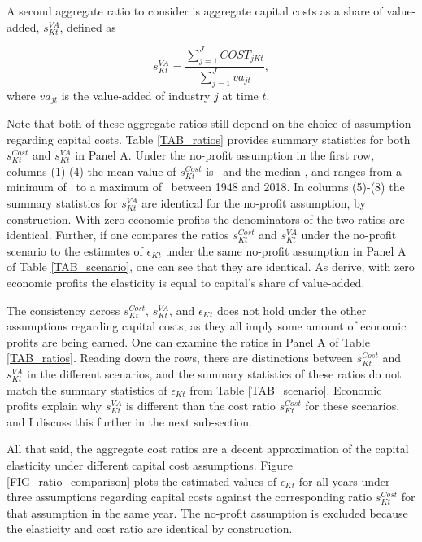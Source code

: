 \documentclass[11pt]{article}
\begin{document}
A second aggregate ratio to consider is aggregate capital costs as a share of value-added, $s^{VA}_{Kt}$, defined as

\begin{equation}
	s^{VA}_{Kt} = \frac{\sum_{j=1}^{J} COST_{jKt}}{\sum_{j=1}^{J} va_{jt}}, \label{EQ_sva}
\end{equation}
where $va_{jt}$ is the value-added of industry $j$ at time $t$.

Note that both of these aggregate ratios still depend on the choice of assumption regarding capital costs. Table \ref{TAB_ratios} provides summary statistics for both $s^{Cost}_{Kt}$ and $s^{VA}_{Kt}$ in Panel A. Under the no-profit assumption in the first row, columns (1)-(4) the mean value of $s^{Cost}_{Kt}$ is \basemeannoprofit \ and the median \basemednoprofit, and ranges from a minimum of \baseminnoprofit \ to a maximum of \basemaxnoprofit \ between 1948 and 2018. In columns (5)-(8) the summary statistics for $s^{VA}_{Kt}$ are identical for the no-profit assumption, by construction. With zero economic profits the denominators of the two ratios are identical. Further, if one compares the ratios $s^{Cost}_{Kt}$ and $s^{VA}_{Kt}$ under the no-profit scenario to the estimates of $\epsilon_{Kt}$ under the same no-profit assumption in Panel A of Table \ref{TAB_scenario}, one can see that they are identical. As \cite{bfshortnote,bfprodge} derive, with zero economic profits the elasticity is equal to capital's share of value-added. 

The consistency across $s^{Cost}_{Kt}$, $s^{VA}_{Kt}$, and $\epsilon_{Kt}$ does not hold under the other assumptions regarding capital costs, as they all imply some amount of economic profits are being earned. One can examine the ratios in Panel A of Table \ref{TAB_ratios}. Reading down the rows, there are distinctions between $s^{Cost}_{Kt}$ and $s^{VA}_{Kt}$ in the different scenarios, and the summary statistics of these ratios do not match the summary statistics of $\epsilon_{Kt}$ from Table \ref{TAB_scenario}. Economic profits explain why $s^{VA}_{Kt}$ is different than the cost ratio $s^{Cost}_{Kt}$ for these scenarios, and I discuss this further in the next sub-section.

All that said, the aggregate cost ratios are a decent approximation of the capital elasticity under different capital cost assumptions. Figure \ref{FIG_ratio_comparison} plots the estimated values of $\epsilon_{Kt}$ for all years under three assumptions regarding capital costs against the corresponding ratio $s^{Cost}_{Kt}$ for that assumption in the same year. The no-profit assumption is excluded because the elasticity and cost ratio are identical by construction.
\end{document}
